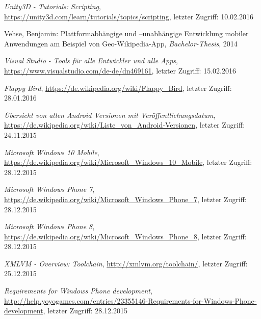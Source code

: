 \begin{thebibliography}{}
\emph{Unity3D - Tutorials: Scripting},
\url{https://unity3d.com/learn/tutorials/topics/scripting}, letzter Zugriff: 10.02.2016

Vehse, Benjamin:
\glqq Plattformabhängige und –unabhängige
Entwicklung mobiler Anwendungen am
Beispiel von Geo-Wikipedia-App\grqq, 
\emph{Bachelor-Thesis}, 2014

\emph{Visual Studio - Tools für alle Entwickler und alle Apps},
\url{https://www.visualstudio.com/de-de/dn469161}, letzter Zugriff: 15.02.2016

\emph{Flappy Bird},
\url{https://de.wikipedia.org/wiki/Flappy_Bird}, letzter Zugriff: 28.01.2016

\emph{Übersicht von allen Android Versionen mit Veröffentlichungsdatum},
\url{https://de.wikipedia.org/wiki/Liste_von_Android-Versionen}, letzter Zugriff: 24.11.2015

\emph{Microsoft Windows 10 Mobile},
\url{https://de.wikipedia.org/wiki/Microsoft_Windows_10_Mobile}, letzter Zugriff: 28.12.2015

\emph{Microsoft Windows Phone 7},
\url{https://de.wikipedia.org/wiki/Microsoft_Windows_Phone_7}, letzter Zugriff: 28.12.2015

\emph{Microsoft Windows Phone 8},
\url{https://de.wikipedia.org/wiki/Microsoft_Windows_Phone_8}, letzter Zugriff: 28.12.2015

\emph{XMLVM - Overview: Toolchain},
\url{http://xmlvm.org/toolchain/}, letzter Zugriff: 25.12.2015

\emph{Requirements for Windows Phone development},
\url{http://help.yoyogames.com/entries/23355146-Requirements-for-Windows-Phone-development}, letzter Zugriff: 28.12.2015

\end{thebibliography}
\clearpage\thispagestyle{empty}
\eigen  %
